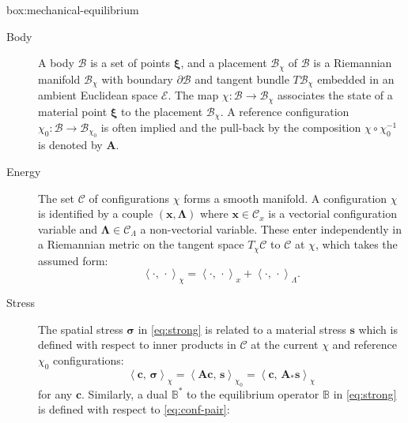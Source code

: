 \begin{ambox}{box:mechanical-equilibrium}
\begin{description}
\item[Body]
A body \(\mathcal{B}\) is a set of points \(\bm{\xi}\), and a placement
\(\mathcal{B}_\chi\) of \(\mathcal{B}\) is a Riemannian manifold
\(\mathcal{B}_\chi\) with boundary \(\partial \mathcal{B}\) and tangent
bundle \(T\mathcal{B}_\chi\) embedded in an ambient Euclidean space
\(\mathcal{E}\). The map
\(\chi\colon \mathcal{B}\rightarrow \mathcal{B}_\chi\) associates the
state of a material point \(\bm{\xi}\) to the placement
\(\mathcal{B}_\chi\). A reference configuration
\(\chi_0\colon \mathcal{B}\rightarrow \mathcal{B}_{\chi_0}\) is often
implied and the pull-back by the composition \(\chi\circ\chi_0^{-1}\) is
denoted by \(\bm{A}\).
\item[Energy]
The set \(\mathscr{C}\) of configurations \(\chi\) forms a smooth
 manifold. A configuration \(\chi\) is identified by a couple
\((\bm{x}, \bm{\Lambda})\) where \(\bm{x}\in\mathscr{C}_x\) is a
vectorial configuration variable and
\(\bm{\Lambda}\in\mathscr{C}_{\scriptscriptstyle{\Lambda}}\) a
non-vectorial variable. These enter independently in a Riemannian metric
on the tangent space \(T_\chi\mathscr{C}\) to \(\mathscr{C}\) at
\(\chi\), which takes the assumed form: 
\begin{equation}
  \left< \cdot , \, \cdot\right>_{\chi} = \left< \cdot , \, \cdot\right>_{x} + \left< \cdot , \, \cdot\right>_{\scriptscriptstyle{\Lambda}} .
  \label{eq:conf-pair}
\end{equation}
%
\item[Stress]
The spatial stress \(\bm{\sigma}\) in \eqref{eq:strong} is related to a
material stress \(\bm{s}\) which is defined with respect to inner products 
in \(\mathscr{C}\) at the current \(\chi\) and reference
\(\chi_0\) configurations:
\begin{equation}
  \left<\bm{c},\, \bm{\sigma}\right>_{\chi}
  =\left< \bm{A}\bm{c},\, \bm{s}\right>_{\chi_0}
  = \left<\bm{c},\, \bm{A}_*\bm{s}\right>_{\chi}
  \label{eq:def-Astar}
\end{equation}
for any \(\bm{c}\).
Similarly, a dual
\(\mathbb{B}^*\) to the equilibrium operator \(\mathbb{B}\) in
\eqref{eq:strong} is defined with respect to \eqref{eq:conf-pair}:
\begin{equation}

\end{equation}
\end{description}
\end{ambox}
